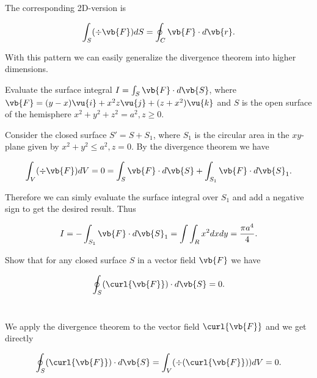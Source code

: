\documentclass[english,a4paper,12pt]{report}
\begin{document}
The corresponding 2D-version is 

\begin{equation}
	\int_{S}^{} (\div{\vb{F} } ) dS = \oint_{C} \vb{F} \cdot d\vb{r} . 
\end{equation}

With this pattern we can easily generalize the divergence theorem into higher dimensions. 

{Evaluate the surface integral \(I = \int_{S}^{} \vb{F} \cdot d\vb{S}  \), where \(\vb{F} = (y-x)\vu{i} + x^2z \vu{j} + (z+x^2) \vu{k}\) and \(S\) is the open surface of the hemisphere \(x^2 + y^2 + z^2 = a^2, z \ge 0\).}
{Consider the closed surface \(S' = S + S_1 \), where \(S_1 \) is the circular area in the \(xy\)-plane given by \(x^2 + y^2 \le a^2, z=0\). By the divergence theorem we have

\begin{equation}
	\int_{V}^{} (\div{\vb{F} } )dV = 0 = \int_{S}^{} \vb{F} \cdot d\vb{S} + \int_{S_1 }^{} \vb{F} \cdot d\vb{S}_{1} .  
\end{equation}

Therefore we can simly evaluate the surface integral over \(S_1 \) and add a negative sign to get the desired result. Thus

\begin{equation}
	I = - \int_{S_1 }^{} \vb{F} \cdot d\vb{S} _{1} = \int \int_{R}^{} x^2dxdy = \frac{\pi a^4}{4}.   
\end{equation}
} 

{Show that for any closed surface \(S\) in a vector field \(\vb{F} \) we have

\begin{equation}
	\oint_{S}  (\curl{\vb{F} } )\cdot d\vb{S} = 0. 
\end{equation}
~
}
{We apply the divergence theorem to the vector field \(\curl{\vb{F} } \) and we get directly

\begin{equation}
	\oint_{S} (\curl{\vb{F} } )\cdot d\vb{S} = \int_{V}^{} (\div{(\curl{\vb{F} } )} ) dV = 0. 
\end{equation}
~
} 
\end{document}
